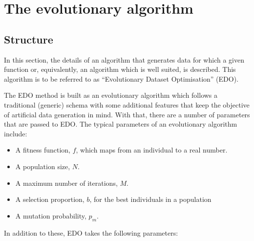 \section{The evolutionary algorithm}\label{section:algorithm}

\subsection{Structure}

In this section, the details of an algorithm that generates data for which a
given function or, equivalently, an algorithm which is well suited, is
described. This algorithm is to be referred to as ``Evolutionary Dataset
Optimisation'' (EDO).

The EDO method is built as an evolutionary algorithm which follows a traditional
(generic) schema with some additional features that keep the objective of
artificial data generation in mind. With that, there are a number of parameters
that are passed to EDO. The typical parameters of an evolutionary algorithm
include:

\begin{itemize}
    \item A fitness function, \(f\), which maps from an individual to a real
        number.
    \item A population size, \(N\).
    \item A maximum number of iterations, \(M\).
    \item A selection proportion, \(b\), for the best individuals in a
        population
    \item A mutation probability, \(p_m\).
\end{itemize}

In addition to these, EDO takes the following parameters:

